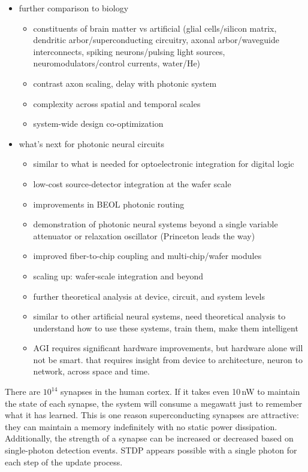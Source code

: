 \documentclass[twocolumn]{article}
\begin{document}
\begin{itemize}

\item further comparison to biology
\begin{itemize}
\item constituents of brain matter vs artificial (glial cells/silicon matrix, dendritic arbor/superconducting circuitry, axonal arbor/waveguide interconnects, spiking neurons/pulsing light sources, neuromodulators/control currents, water/He)
\item contrast axon scaling, delay with photonic system
\item complexity across spatial and temporal scales
\item system-wide design co-optimization
\end{itemize}

\item what's next for photonic neural circuits
\begin{itemize}
\item similar to what is needed for optoelectronic integration for digital logic
\item low-cost source-detector integration at the wafer scale
\item improvements in BEOL photonic routing
\item demonstration of photonic neural systems beyond a single variable attenuator or relaxation oscillator (Princeton leads the way)
\item improved fiber-to-chip coupling and multi-chip/wafer modules
\item scaling up: wafer-scale integration and beyond
\item further theoretical analysis at device, circuit, and system levels
\item similar to other artificial neural systems, need theoretical analysis to understand how to use these systems, train them, make them intelligent
\item AGI requires significant hardware improvements, but hardware alone will not be smart. that requires insight from device to architecture, neuron to network, across space and time.
\end{itemize}


\end{itemize}

\vspace{4em}
There are $10^{14}$ synapses in the human cortex. If it takes even 10\,nW to maintain the state of each synapse, the system will consume a megawatt just to remember what it has learned. This is one reason superconducting synapses are attractive: they can maintain a memory indefinitely with no static power dissipation. Additionally, the strength of a synapse can be increased or decreased based on single-photon detection events. STDP appears possible with a single photon for each step of the update process. 
\end{document}
